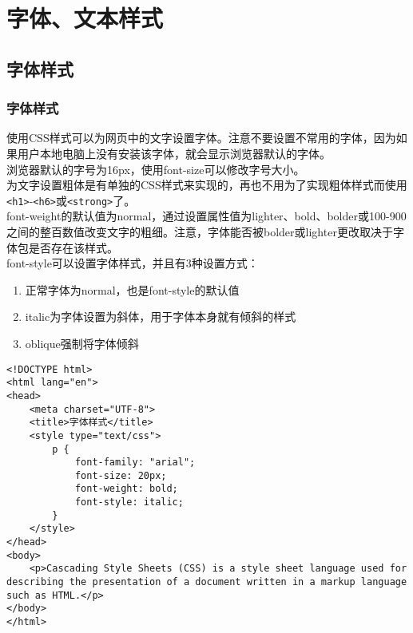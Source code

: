 \chapter{字体、文本样式}

\section{字体样式}

\subsection{字体样式}

使用CSS样式可以为网页中的文字设置字体。注意不要设置不常用的字体，因为如果用户本地电脑上没有安装该字体，就会显示浏览器默认的字体。 \\

浏览器默认的字号为16px，使用font-size可以修改字号大小。 \\

为文字设置粗体是有单独的CSS样式来实现的，再也不用为了实现粗体样式而使用\lstinline|<h1>|-\lstinline|<h6>|或\lstinline|<strong>|了。 \\

font-weight的默认值为normal，通过设置属性值为lighter、bold、bolder或100-900之间的整百数值改变文字的粗细。注意，字体能否被bolder或lighter更改取决于字体包是否存在该样式。 \\

font-style可以设置字体样式，并且有3种设置方式：

\begin{enumerate}
    \item 正常字体为normal，也是font-style的默认值
    \item italic为字体设置为斜体，用于字体本身就有倾斜的样式
    \item oblique强制将字体倾斜
\end{enumerate}

\begin{lstlisting}[style=htmlcssjs, title=字体样式]
<!DOCTYPE html>
<html lang="en">
<head>
    <meta charset="UTF-8">
    <title>字体样式</title>
    <style type="text/css">
        p {
            font-family: "arial";
            font-size: 20px;
            font-weight: bold;
            font-style: italic;
        }   
    </style>
</head>
<body>
    <p>Cascading Style Sheets (CSS) is a style sheet language used for describing the presentation of a document written in a markup language such as HTML.</p>
</body>
</html>
\end{lstlisting}

\newpage

